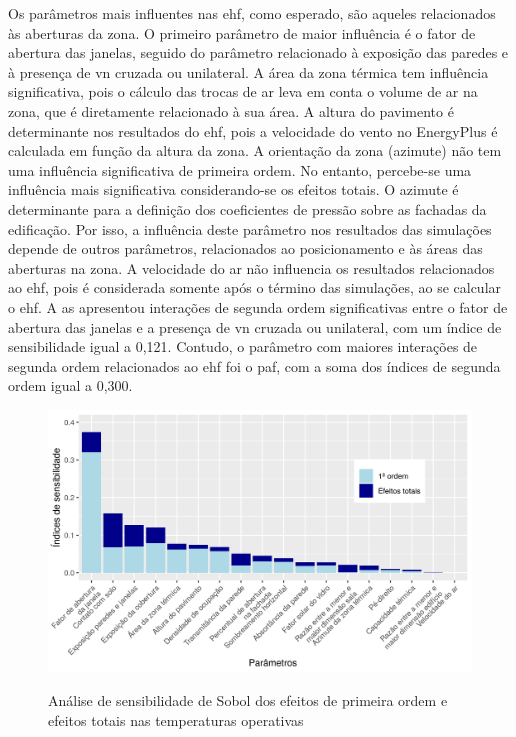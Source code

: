 \documentclass[brazil,hardcopy,openany]{ufscthesis} %
\newcommand{\sasize}{1}
\begin{document}
Os parâmetros mais influentes nas \acrshort{ehf}, como esperado, são aqueles relacionados às aberturas da zona. 
O primeiro parâmetro de maior influência é o fator de abertura das janelas, seguido do parâmetro relacionado à exposição das paredes e à presença de \acrshort{vn} cruzada ou unilateral. 
A área da zona  térmica tem influência significativa, pois o cálculo das trocas de ar leva em conta o volume de ar na zona, que é diretamente relacionado à sua área. 
A altura do pavimento é determinante nos resultados do \acrshort{ehf}, pois a velocidade do vento no EnergyPlus é calculada em função da altura da zona.
A orientação da zona (azimute) não tem uma influência significativa de primeira ordem. No entanto, percebe-se uma influência mais significativa considerando-se os efeitos totais. 
O azimute é determinante para a definição dos coeficientes de pressão sobre as fachadas da edificação. Por isso, a influência deste parâmetro nos resultados das simulações depende de outros parâmetros, relacionados ao posicionamento e às áreas das aberturas na zona.
A velocidade do ar não influencia os resultados relacionados ao \acrshort{ehf}, pois é considerada somente após o término das simulações, ao se calcular o \acrshort{ehf}.
A \acrshort{as} apresentou interações de segunda ordem significativas entre o fator de abertura das janelas e a presença de \acrshort{vn} cruzada ou unilateral, com um índice de sensibilidade igual a 0,121.
Contudo, o parâmetro com maiores interações de segunda ordem relacionados ao \acrshort{ehf} foi o \acrshort{paf}, com a soma dos índices de segunda ordem igual a 0,300.

\begin{figure}[H]
	\centering
	\caption{Análise de sensibilidade de Sobol dos efeitos de primeira ordem e efeitos totais nas temperaturas operativas}
	\includegraphics[width=\sasize\linewidth]{img/as_temp.png}
	\label{fig:as_temp}
\end{figure}
\end{document}
